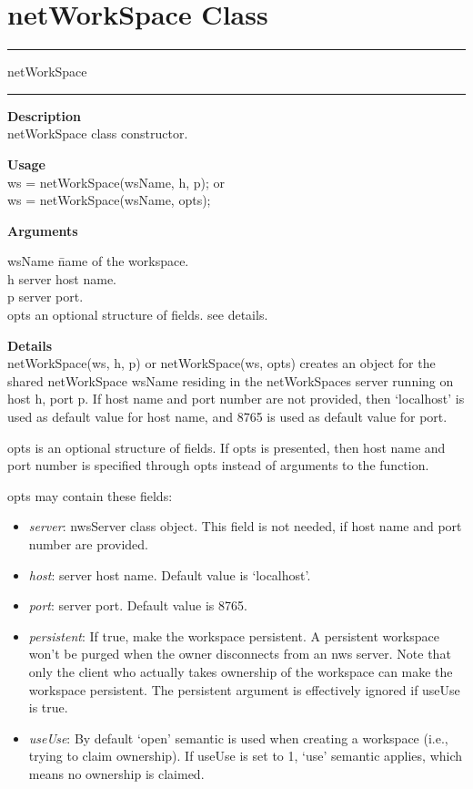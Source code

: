 \section {netWorkSpace Class}
\rule[0.06in]{6in}{0.01in}
\newline
netWorkSpace
\newline
\rule{6in}{0.01in}
\begin{list}{}{}
	\item {\bf Description\\}
	netWorkSpace class constructor.
	\item {\bf Usage\\}
	ws = netWorkSpace(wsName, h, p);
	or \\
	ws = netWorkSpace(wsName, opts);
	\item {\bf Arguments}
 		\begin{tabbing}
		wsName \hspace{2.5cm} \= name of the workspace.\\
		h \> server host name.\\
		p \> server port.\\
		opts \> an optional structure of fields. see details.\\
		\end{tabbing}
	\item {\bf Details\\}
	netWorkSpace(ws, h, p) or netWorkSpace(ws, opts) creates an object for the shared netWorkSpace wsName residing in the netWorkSpaces server 
	running on host h, port p. If host name and port number are not provided, then `localhost' is used as default
	value for host name, and 8765 is used as default value for port.

	opts is an optional structure of fields. If opts is presented, then host name and port number is specified through opts instead
	of arguments to the function.

	opts may contain these fields:
	\begin{itemize}
		\item \textit {server}: nwsServer class object. This field is not needed, if host name and port number are provided. 
		\item \textit {host}: server host name. Default value is `localhost'.
		\item \textit {port}: server port. Default value is 8765. 
		\item \textit {persistent}: If true, make the workspace persistent. A persistent workspace won't be purged when the owner
		disconnects from an nws server. Note that only the client who actually takes ownership of the workspace can make 
		the workspace persistent. The persistent argument is effectively ignored if useUse is true. 
		\item \textit {useUse}: By default `open' semantic is used when creating a workspace (i.e., trying to claim ownership). 
		If useUse is set to 1, `use' semantic applies, which means no ownership is claimed.\\
	\end{itemize}
	

\end{list}
